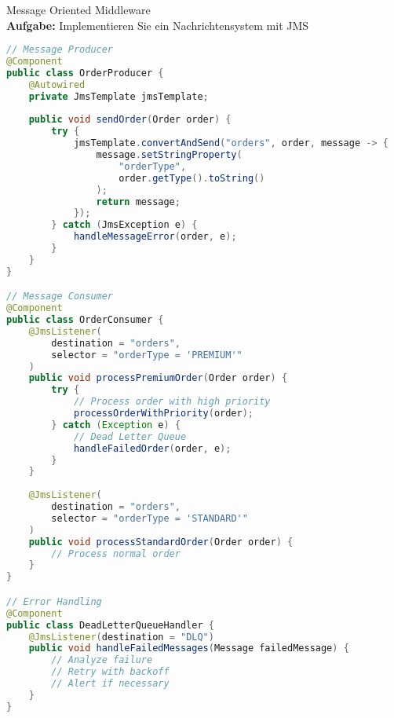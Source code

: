 \begin{example2}{Message Oriented Middleware}\\
\textbf{Aufgabe:} Implementieren Sie ein Nachrichtensystem mit JMS

\begin{lstlisting}[language=Java, style=base]
// Message Producer
@Component
public class OrderProducer {
    @Autowired
    private JmsTemplate jmsTemplate;
    
    public void sendOrder(Order order) {
        try {
            jmsTemplate.convertAndSend("orders", order, message -> {
                message.setStringProperty(
                    "orderType", 
                    order.getType().toString()
                );
                return message;
            });
        } catch (JmsException e) {
            handleMessageError(order, e);
        }
    }
}

// Message Consumer
@Component
public class OrderConsumer {
    @JmsListener(
        destination = "orders",
        selector = "orderType = 'PREMIUM'"
    )
    public void processPremiumOrder(Order order) {
        try {
            // Process order with high priority
            processOrderWithPriority(order);
        } catch (Exception e) {
            // Dead Letter Queue
            handleFailedOrder(order, e);
        }
    }
    
    @JmsListener(
        destination = "orders",
        selector = "orderType = 'STANDARD'"
    )
    public void processStandardOrder(Order order) {
        // Process normal order
    }
}

// Error Handling
@Component
public class DeadLetterQueueHandler {
    @JmsListener(destination = "DLQ")
    public void handleFailedMessages(Message failedMessage) {
        // Analyze failure
        // Retry with backoff
        // Alert if necessary
    }
}
\end{lstlisting}
\end{example2}

